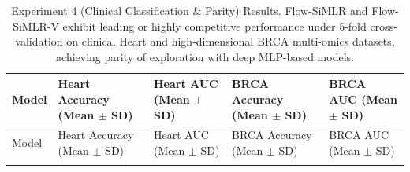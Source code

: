\documentclass[
  letterpaper,
]{report}
\begin{document}
\begin{longtable}[]{@{}
  >{\raggedright\arraybackslash}p{}
  >{\centering\arraybackslash}p{}
  >{\centering\arraybackslash}p{}
  >{\centering\arraybackslash}p{}
  >{\centering\arraybackslash}p{}@{}}
\caption{Experiment 4 (Clinical Classification \& Parity) Results.
Flow-SiMLR and Flow-SiMLR-V exhibit leading or highly competitive
performance under 5-fold cross-validation on clinical Heart and
high-dimensional BRCA multi-omics datasets, achieving parity of
exploration with deep MLP-based
models.}\label{tbl-exp4-results}\tabularnewline
\toprule\noalign{}
\begin{minipage}[b]{\linewidth}\raggedright
Model
\end{minipage} & \begin{minipage}[b]{\linewidth}\centering
Heart Accuracy (Mean \(\pm\) SD)
\end{minipage} & \begin{minipage}[b]{\linewidth}\centering
Heart AUC (Mean \(\pm\) SD)
\end{minipage} & \begin{minipage}[b]{\linewidth}\centering
BRCA Accuracy (Mean \(\pm\) SD)
\end{minipage} & \begin{minipage}[b]{\linewidth}\centering
BRCA AUC (Mean \(\pm\) SD)
\end{minipage} \\
\midrule\noalign{}
\endfirsthead
\toprule\noalign{}
\begin{minipage}[b]{\linewidth}\raggedright
Model
\end{minipage} & \begin{minipage}[b]{\linewidth}\centering
Heart Accuracy (Mean \(\pm\) SD)
\end{minipage} & \begin{minipage}[b]{\linewidth}\centering
Heart AUC (Mean \(\pm\) SD)
\end{minipage} & \begin{minipage}[b]{\linewidth}\centering
BRCA Accuracy (Mean \(\pm\) SD)
\end{minipage} & \begin{minipage}[b]{\linewidth}\centering
BRCA AUC (Mean \(\pm\) SD)
\end{minipage} \\
\midrule\noalign{}

\end{longtable}
\end{document}

